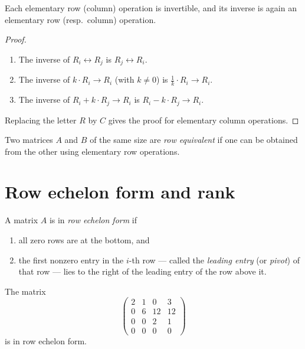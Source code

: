 \begin{theorem}
Each elementary row (column) operation is invertible, and its inverse is again an elementary row (resp.\
column) operation.
\end{theorem}

\begin{proof}
\begin{enumerate}
\item The inverse of $R_i\leftrightarrow R_j$ is $R_j\leftrightarrow R_i$.
\item The inverse of $k\cdot R_i\rightarrow R_i$ (with $k\neq 0$) is $\tfrac{1}{k}\cdot R_i\rightarrow R_i$.
\item The inverse of $R_i+k\cdot R_j\rightarrow R_i$ is $R_i-k\cdot R_j\rightarrow R_i$.
\end{enumerate}
Replacing the letter $R$ by $C$ gives the proof for elementary column operations.
\end{proof}

\begin{definition}
Two matrices $A$ and $B$ of the same size are \emph{row equivalent} if one can be obtained from the other
using elementary row operations.
\end{definition}

\section{Row echelon form and rank}

\begin{definition}
A matrix $A$ is in \emph{row echelon form} if
\begin{enumerate}
\item all zero rows are at the bottom, and
\item the first nonzero entry in the $i$-th row — called the \emph{leading entry} (or \emph{pivot}) of that
row — lies to the right of the leading entry of the row above it.
\end{enumerate}
\end{definition}

\begin{example}
The matrix
\[
\left( \begin{array}{cccc}
2 & 1 & 0 & 3\\ 0 & 6 & 12 & 12\\ 0 & 0 & 2 & 1 \\ 0 & 0 & 0 & 0
\end{array} \right)
\]
is in row echelon form.
\end{example}

